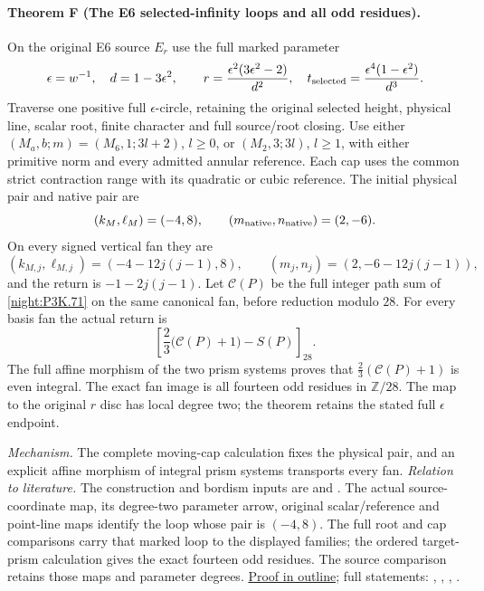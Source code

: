 \paragraph{Theorem F (The E6 selected-infinity loops and all odd residues).}
\label{series:IV:F}
On the original E6 source $E_r$ use the full marked parameter
\[
 \epsilon=w^{-1},\quad d=1-3\epsilon^2,\qquad
 r=\frac{\epsilon^2(3\epsilon^2-2)}{d^2},\quad
 t_{
 \rm selected}=\frac{\epsilon^4(1-\epsilon^2)}{d^3}.
\]
Traverse one positive full $\epsilon$-circle, retaining the
original selected height, physical line, scalar root, finite
character and full source/root closing. Use either
$(M_a,b;m)=(M_6,1;3l+2)$, $l\ge0$, or
$(M_2,3;3l)$, $l\ge1$, with either primitive norm and every
admitted annular reference. Each cap uses the common strict
contraction range with its quadratic or cubic reference.
The initial physical pair and native pair are
\[
 (k_M,\ell_M)=(-4,8),\qquad(m_{\rm native},n_{\rm native})=(2,-6).
\]
On every signed vertical fan they are
\[
 (k_{M,j},\ell_{M,j})=(-4-12j(j-1),8),\qquad
 (m_j,n_j)=(2,-6-12j(j-1)),
\]
and the return is $-1-2j(j-1)$.
Let $\mathscr C(P)$ be the full integer path sum of
\cref{night:P3K.71} on the same canonical fan, before reduction
modulo $28$. For every basis fan the actual return is
\[
 \left[\frac23\bigl(\mathscr C(P)+1\bigr)-S(P)\right]_{28}.
\]
The full affine morphism of the two prism systems proves that
$\tfrac23(\mathscr C(P)+1)$ is even integral. The exact fan image
is all fourteen odd residues in $\mathbb Z/28$. The map to the
original $r$ disc has local degree two; the theorem retains the
stated full $\epsilon$ endpoint.

\textit{Mechanism.} The complete moving-cap calculation fixes the physical pair,
and an explicit affine morphism of integral prism systems transports every fan.
\textit{Relation to literature.} The construction and bordism inputs are \cite[Section~2 and Remark~8.5]{Engel2026} and \cite[Theorem~4.9 and Lemma~6.2]{Jin2026}. The actual source-coordinate map, its degree-two parameter arrow, original scalar/reference and point-line maps identify the loop whose pair is $(-4,8)$. The full root and cap comparisons carry that marked loop to the displayed families; the ordered target-prism calculation gives the exact fourteen odd residues. The source comparison retains those maps and parameter degrees.
\hyperlink{outline-IV-F}{Proof in outline}; full statements: , , , .

